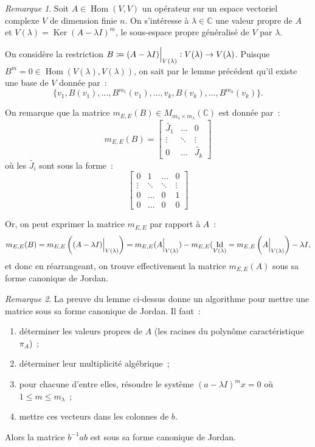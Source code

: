 \documentclass{article}
\DeclareMathOperator{\Id}{Id}
\DeclareMathOperator{\Ker}{Ker}
\DeclareMathOperator{\Hom}{Hom}
\newcommand{\C}{\mathbb C}
\newcommand{\M}[3]{M_{#1 \times #2}(#3)}
\newcommand{\restr}[2]{ %
	\left.\kern-\nulldelimiterspace %
	#1 %
	\vphantom{\big|} %
	\right|_{#2} %
}
\theoremstyle{definition}
\theoremstyle{remark}
\newtheorem*{rmq}{Remarque}
\begin{document}
		\begin{rmq} Soit $A \in \Hom(V, V)$ un opérateur sur un espace vectoriel complexe $V$ de dimension finie $n$. On s'intéresse à $\lambda \in \C$ une
		valeur propre de $A$ et $V(\lambda) = \Ker(A - \lambda I)^m$, le sous-espace propre généralisé de $V$ par $\lambda$.

		On considère la restriction $B \coloneqq \restr {(A - \lambda I)}{V(\lambda)} : V(\lambda) \to V(\lambda)$. Puisque
		$B^m = 0 \in \Hom(V(\lambda), V(\lambda))$, on sait par le lemme précédent qu'il existe une base de $V$ donnée par~:
		\[\{v_1, B(v_1), \dotsc, B^{m_1}(v_1), \dotsc, v_k, B(v_k), \dotsc, B^{m_k}(v_k)\}.\]

		On remarque que la matrice $m_{E, E}(B) \in \M {m_\lambda}{m_\lambda}\C$ est donnée par~:
		\[m_{E, E}(B) =
		\begin{bmatrix}
			\widetilde {J_1} & \ldots & 0 \\
			\vdots & \ddots & \vdots \\
			0 & \ldots & \widetilde {J_k}
		\end{bmatrix}
		\]
		où les $\widetilde {J_i}$ sont sous la forme~:
		\[\begin{bmatrix}
			0      & 1      & \ldots & 0 \\
			\vdots & \ddots & \ddots & \vdots \\
			0      & \ldots & 0      &  1 \\
			0      & \ldots &     0  &   0
		\end{bmatrix}\]

		Or, on peut exprimer la matrice $m_{E, E}$ par rapport à $A$~:
		\[m_{E, E}(B) = m_{E, E}\left(\restr {(A-\lambda I)}{V(\lambda)}\right) = m_{E, E}(\restr A{V(\lambda)}) - m_{E, E}(\Id_{V(\lambda)}
		= m_{E, E}\left(\restr A{V(\lambda)}\right) - \lambda I,\]
		et donc en réarrangeant, on trouve effectivement la matrice $m_{E, E}(A)$ sous sa forme canonique de Jordan.
		\end{rmq}

		\begin{rmq}	La preuve du lemme ci-dessus donne un algorithme pour mettre une matrice sous sa forme canonique de Jordan. Il faut~:
		\begin{enumerate}
			\item déterminer les valeurs propres de $A$ (les racines du polynôme caractéristique $\pi_A$)~;
			\item déterminer leur multiplicité algébrique~;
			\item pour chacune d'entre elles, résoudre le système $(a-\lambda I)^mx = 0$ où $1 \leq m \leq m_\lambda$~;
			\item mettre ces vecteurs dans les colonnes de $b$.
		\end{enumerate}
		Alors la matrice $b^{-1}ab$ est sous sa forme canonique de Jordan.
		\end{rmq}
\end{document}
